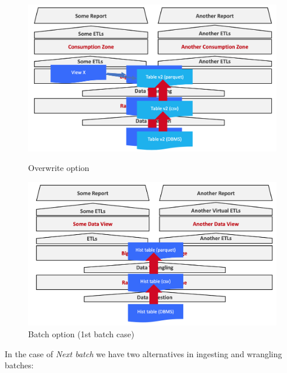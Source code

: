\documentclass[10pt,a4paper]{article}
\begin{document}
 \begin{figure}[ht!]
\centering
\begin{minipage}{.5\textwidth}
  \centering
  \includegraphics[width=.8\linewidth]{images/overwrite}
  \caption{Overwrite option}
\end{minipage}%
\begin{minipage}{.5\textwidth}
  \centering
  \includegraphics[width=.8\linewidth]{images/1st-batch}
  \caption{Batch option (1st batch case)}
\end{minipage}
\end{figure}
In the case of \textit{Next batch} we have two alternatives in ingesting and wrangling batches:
\end{document}
